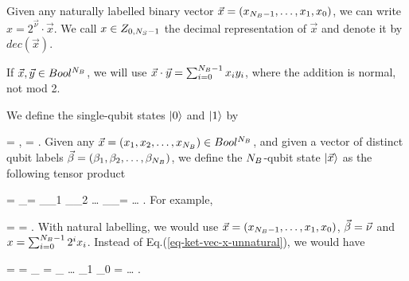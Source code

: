 Given any naturally labelled
binary vector $\vec{x} =
(x_{{N_B}-1}, \ldots, x_1, x_0)$,
we can write $x=2^{\vec{\nu}}\cdot \vec{x}$.
We call $x\in Z_{0, {N_S}-1}$ the decimal representation
of $\vec{x}$ and denote it by $dec(\vec{x})$.

If $\vec{x},\vec{y}\in Bool^{N_B}$,
we will use $\vec{x}\cdot \vec{y}=
 \sum_{i=0}^{{N_B}-1} x_i y_i$,
 where the addition is normal, not mod 2.

We define the single-qubit states
$\left\vert{0}\right\rangle$ and $\left\vert{1}\right\rangle$ by

\beq
{} =
\left[
\begin{array}{c}
1 \\ 0
\end{array}
\right]
\;\;,\;\;
 =
\left[
\begin{array}{c}
0 \\ 1
\end{array}
\right]
\;.
\eeq
Given any
$\vec{x}=(x_1, x_2, \ldots, x_{N_B}) \in Bool^{{N_B}}$,
and given a vector of distinct qubit labels
${\vec{\beta}} = (\beta_1, \beta_2,
 \ldots, \beta_{N_B})$,
we define the
${N_B}$-qubit state
$\left\vert{\vec{x}}\right\rangle$ as the following tensor product

\beq
{} =
_\vecbitb =
_{\bitb_1}
_{\bitb_2}
\ldots
{}_{\bitb_\nb}=
\otimes
{}
\ldots\otimes
{}
\;.
\label{eq-ket-vec-x-unnatural}
\eeq
For example,

\beq
{} =
\left[
\begin{array}{c}
1 \\ 0
\end{array}
\right]
\otimes
\left[
\begin{array}{c}
0 \\ 1
\end{array}
\right]
=
\left[
\begin{array}{c}
0 \\ 1 \\ 0 \\0
\end{array}
\right]
\;.
\eeq
With natural labelling,
we would use $\vec{x} =
(x_{{N_B}-1}, \ldots, x_1, x_0)$,
${\vec{\beta}}=\vec{\nu}$
and $x=\sum_{i=0}^{{N_B}-1}2^i x_i$.
Instead of
Eq.(\ref{eq-ket-vec-x-unnatural}),
we would have

\beq
{}=
 =
_{\vec{\nu}} =
_{}
\ldots
{}_{1}
_{0}
=
\otimes
\ldots\otimes
{}\otimes
{}
\;.
\label{eq-ket-vec-x-natural}
\eeq

